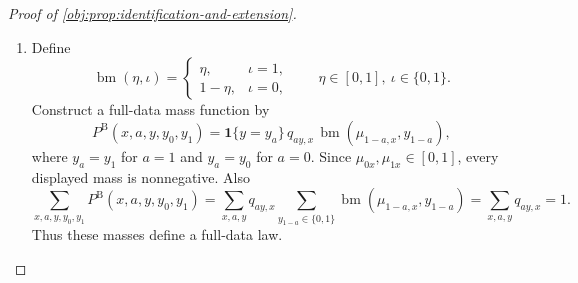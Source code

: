 \documentclass[11pt]{article}
\begin{document}
\begin{proof}[Proof of \cref{obj:prop:identification-and-extension}]
\begin{enumerate}
\[+\operatorname{tot}\left(
\frac{\zeta}{\phi+\zeta}-\frac{\zeta'}{\phi'+\zeta'}
\right),
\]
and
\[
\left|\frac{\zeta}{\phi+\zeta}-\frac{\zeta'}{\phi'+\zeta'}\right|
\le
\frac{|\zeta-\zeta'|+|\phi-\phi'|}{\phi+\zeta},
\]
because
\[
\frac{\zeta}{\phi+\zeta}-\frac{\zeta'}{\phi'+\zeta'}
=
\frac{\phi'(\zeta-\zeta')+\zeta'(\phi'-\phi)}
{(\phi+\zeta)(\phi'+\zeta')}.
\]
Together with \(0\le\zeta'/(\phi'+\zeta')\le1\) and
\(\operatorname{tot}/(\phi+\zeta)\le\epsilon^{-1}\), this gives
\[
|\operatorname{scal}_{\epsilon}-\operatorname{scal}_{\epsilon}'|
\le (1+\epsilon^{-1})\operatorname{dist}_{\mathrm{cell}}.
\]
If one total is zero, nonnegativity forces that quadruple to vanish, and the bound follows from
\(0\le \operatorname{scal}_{\epsilon}\le\operatorname{tot}\) and
\(1\le1+\epsilon^{-1}\).  Applying this estimate to each arm, after merely permuting the four
coordinates, yields
\[
|g_{a,\epsilon}(u)-g_{a,\epsilon}(v)|
\le
(1+\epsilon^{-1})\sum_{\jmath\in\mathcal J}|u_{\jmath}-v_{\jmath}|.
\]
Finally,
\[
|\bar f_\epsilon(u)-\bar f_\epsilon(v)|
\le
\max_{a\in\{0,1\}}|g_{a,\epsilon}(u)-g_{a,\epsilon}(v)|,
\]
which proves the asserted global Lipschitz property. %

\item Define
\[
\operatorname{bm}(\eta,\iota)=
\begin{cases}
\eta, & \iota=1,\\
1-\eta, & \iota=0,
\end{cases}
\qquad \eta\in[0,1],\ \iota\in\{0,1\}.
\]
Construct a full-data mass function by
\[
P^{\mathrm B}(x,a,y,y_0,y_1)
=
\mathbf 1\{y=y_a\}\,
q_{ay,x}\,
\operatorname{bm}(\mu_{1-a,x},y_{1-a}),
\]
where \(y_a=y_1\) for \(a=1\) and \(y_a=y_0\) for \(a=0\).  Since
\(\mu_{0x},\mu_{1x}\in[0,1]\), every displayed mass is nonnegative.  Also
\[
\sum_{x,a,y,y_0,y_1} P^{\mathrm B}(x,a,y,y_0,y_1)
=
\sum_{x,a,y}q_{ay,x}\sum_{y_{1-a}\in\{0,1\}}\operatorname{bm}(\mu_{1-a,x},y_{1-a})
=
\sum_{x,a,y}q_{ay,x}=1.
\]
Thus these masses define a full-data law. %


\end{enumerate}
\end{proof}
\end{document}

